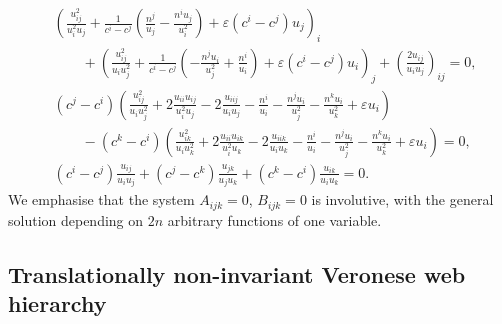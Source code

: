\documentclass[12pt, a4paper]{article}
\theoremstyle{definition}
\begin{document}
\begin{align*}
	&\!\left(\frac{u_{ij}^2}{u_i^2u_j} +\frac{1}{c^i-c^j}\left(\frac{n^j}{u_j} - \frac{n^i u_j}{u_i^2} \right)+\varepsilon (c^i-c^j)u_j \right)_i \\
	&\qquad + \left(\frac{u_{ij}^2}{u_iu_j^2} +\frac{1}{c^i-c^j}\left( -\frac{n^j u_i}{u_j^2} + \frac{n^i}{u_i} \right) + \varepsilon (c^i-c^j)u_i \right)_j + \left(\frac{2u_{ij}}{u_iu_j}\right)_{ij}=0, \\
	&(c^j - c^i) \left( \frac{u_{ij}^2}{u_i u_j^2} + 2 \frac{u_{ii}u_{ij}}{u_i^2 u_j} - 2 \frac{u_{iij}}{u_i u_j} - \frac{n^i}{u_i} - \frac{n^j u_i}{u_j^2} - \frac{n^k u_i}{u_k^2} + \varepsilon u_i \right) \\
	&\qquad - (c^k - c^i) \left( \frac{u_{ik}^2}{u_i u_k^2} + 2 \frac{u_{ii}u_{ik}}{u_i^2 u_k} - 2 \frac{u_{iik}}{u_i u_k} - \frac{n^i}{u_i} - \frac{n^j u_i}{u_j^2} - \frac{n^k u_i}{u_k^2} + \varepsilon u_i \right) = 0,  
	\\
	& (c^i-c^j)\frac{u_{ij}}{u_iu_j}+(c^j-c^k)\frac{u_{jk}}{u_ju_k}+(c^k-c^i)\frac{u_{ik}}{u_iu_k} = 0 .
\end{align*}
We emphasise that the system  $A_{ijk} = 0$, $B_{ijk} = 0$ is involutive, with the general solution depending on $2n$ arbitrary functions of one variable.

\subsection{Translationally non-invariant Veronese web hierarchy}
\end{document}
